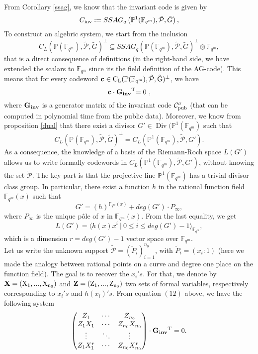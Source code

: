 \documentclass[10pt]{article}
\newcommand{\cd}{\cdot}
\newcommand{\PP}{\mathbb{P}}
\newcommand{\fqm}{\mathbb{F}_{q^m}}
\newcommand{\su}{\subseteq}
\newcommand{\PR}{\mathcal{P}}
\newcommand{\Div}{\operatorname{Div}}
\begin{document}
From Corollary \ref{ssag}, we know that the invariant code is given by 
\[C_{\rm{inv}} := SSAG_q\left(\PP^1(\fqm),\tilde{\PR},\tilde{G}\right),\]
To construct an algebric system, we start from the inclusion 
\[C_L(\PP(\fqm),\tilde{\PR},\tilde{G})^{\perp} \su SSAG_q(\PP(\fqm),\tilde{\PR},\tilde{G})^{\perp} \otimes \fqm,\]
that is a direct consequence of definitions (in the right-hand side, we have extended the scalars to $\fqm$ since its the field definition of the AG-code). This means that for every codeword $\bf{c} \rm \in C_L(\PP(\fqm),\tilde{\PR},\tilde{G})^{\perp}$, we have 
\begin{equation}
\bf{c \cd G_{inv}}^{\rm{T}}  \rm {= 0}\ ,
\end{equation}
where $\bf{G_{inv}}$ is a generator matrix of the invariant code $\mathcal{C}_{\rm pub}^{\sigma}$ (that can be computed in polynomial time from the public data). Moreover, we know from proposition \ref{dual} that there exist a divisor $G' \in \Div(\PP^1(\fqm)$ such that
\[ C_L(\PP(\fqm),\tilde{\PR},\tilde{G})^{\perp} = C_L(\PP^1(\fqm),\tilde{\PR},G').\]
As a consequence, the knowledge of a basis of the Riemann-Roch space $L(G')$ allows us to write formally codewords in $C_L(\PP^1(\fqm),\tilde{\PR},G')$, without knowing the set $\tilde{\PR}$. The key part is that the projective line $\PP^1(\fqm)$ has a trivial divisor class group. In particular, there exist a function $h$ in the rational function field $\fqm(x)$ such that
\[ G' = (h)^{\fqm(x)} + deg(G') \cd P_{\infty},\]
where $P_{\infty}$ is the unique pôle of $x$ in $\fqm(x)$. From the last equality, we get
\[L(G') = \langle h(x)x^i \ | \ 0 \leq i \leq deg(G')-1\rangle_{\fqm},\]
which is a dimension $r=deg(G')-1$ vector space over $\fqm$. \\
Let us write the unknown support $\tilde{\PR} = (\tilde{P}_i)_{i=1}^{n_0}$, with $\tilde{P}_i=(x_i:1)$ (here we made the analogy between rational points on a curve and degree one place on the function field). The goal is to recover the $x_i's$. For that, we denote by  
$\bf{X} \rm = (X_1,...,X_{n_0})$ and $\bf{Z} \rm = (Z_1,...,Z_{n_0})$ two sets of formal variables, respectively corresponding to $x_i's$ and $h(x_i)'s$. From equation $(12)$ above, we have the following system
\begin{equation*}
\begin{pmatrix}
Z_1 & \cdots & Z_{n_0} \\
Z_1X_1 & \cdots & Z_{n_0}X_{n_0} \\
\vdots & \ddots & \vdots \\
Z_1X_1^r & \cdots & Z_{n_0}X_{n_0}^r 
\end{pmatrix}
\cd \bf{G_{inv}} \rm{^T} = 0.
\end{equation*}
\end{document}
